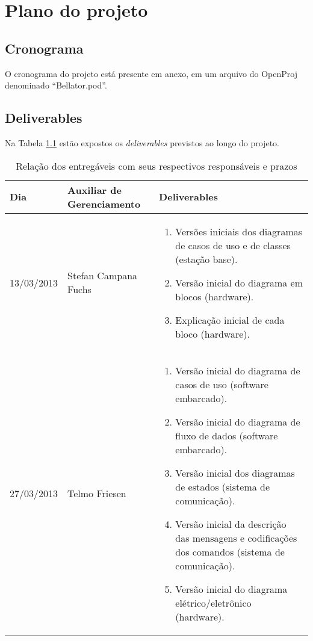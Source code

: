 \chapter{Plano do projeto}
\section{Cronograma}
O cronograma do projeto está presente em anexo, em um arquivo do OpenProj denominado ``Bellator.pod''.

\section{Deliverables}

Na Tabela \ref{tab:deliverables1} estão expostos os \textit{deliverables} previstos ao longo do projeto.

\begin{table}[h]
  \centering
  \caption{Relação dos entregáveis com seus respectivos responsáveis e prazos}
  \begin{tabular}{p{3cm}|p{4cm}||p{7cm}}
    \toprule
    \textbf{Dia}   & \textbf{Auxiliar de Gerenciamento} & \textbf{Deliverables} \\
    \hline
    13/03/2013 & Stefan Campana Fuchs & 
    \begin{enumerate}[topsep=0pt, partopsep=0pt, itemsep=0pt]
      \item Versões iniciais dos diagramas de casos de uso e de classes (estação base).
      \item Versão inicial do diagrama em blocos (hardware).
      \item Explicação inicial de cada bloco (hardware).
    \end{enumerate}\\
    \hline
    27/03/2013 & Telmo Friesen & 
    \begin{enumerate}[topsep=0pt, partopsep=0pt, itemsep=0pt]
      \item Versão inicial do diagrama de casos de uso (software embarcado).
      \item Versão inicial do diagrama de fluxo de dados (software embarcado).
      \item Versão inicial dos diagramas de estados (sistema de comunicação).
      \item Versão inicial da descrição das mensagens e codificações dos comandos (sistema de comunicação).
      \item Versão inicial do diagrama elétrico/eletrônico (hardware).
    \end{enumerate}\\
  \end{tabular}%
  \label{tab:deliverables1}%
\end{table}%


